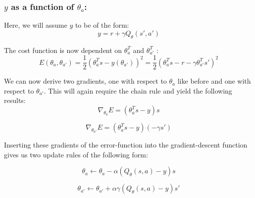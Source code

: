 \subsubsection{$y$ as a function of $\theta_a$:}

Here, we will assume $y$ to be of the form:
$$
y = r + \gamma Q_{\theta}(s', a')
$$

The cost function is now dependent on $\theta_a ^{T}$ and $\theta_{a'} ^{T}$ :
$$
E(\theta_a, \theta_{a'}) = \frac{1}{2} (\theta_a ^{T} s - y(\theta_{a'}))^2 = \frac{1}{2} (\theta_a ^{T} s - r - \gamma \theta_{a'}^{T} s')^2
$$

We can now derive two gradients, one with respect to $\theta_a$ like before and one with respect to $\theta_{a'}$. This will again require the chain rule and yield the following results:
$$
\nabla_{\theta_a} E = (\theta_a ^{T} s - y)s
$$

$$
\nabla_{\theta_{a'}} E = (\theta_a ^{T} s - y)(-\gamma s')
$$

Inserting these gradients of the error-function into the gradient-descent function gives us two update rules of the following form:

$$
\theta_a \leftarrow \theta_a - \alpha (Q_{\theta}(s,a) - y)s
$$

$$
\theta_{a'} \leftarrow \theta_{a'} + \alpha \gamma (Q_{\theta}(s,a) - y)s'
$$



